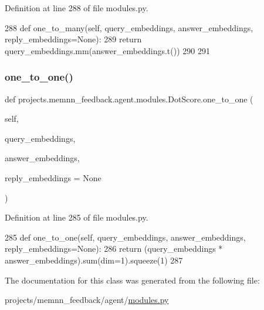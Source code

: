 Definition at line 288 of file modules.\+py.


\begin{DoxyCode}
288     \textcolor{keyword}{def }one\_to\_many(self, query\_embeddings, answer\_embeddings, reply\_embeddings=None):
289         \textcolor{keywordflow}{return} query\_embeddings.mm(answer\_embeddings.t())
290 
291 
\end{DoxyCode}
\mbox{\label{classprojects_1_1memnn__feedback_1_1agent_1_1modules_1_1DotScore_aa8bc1b8eefcd08b7e2bf4540a379ad41}} 
\subsubsection{\texorpdfstring{one\+\_\+to\+\_\+one()}{one\_to\_one()}}
{\footnotesize\ttfamily def projects.\+memnn\+\_\+feedback.\+agent.\+modules.\+Dot\+Score.\+one\+\_\+to\+\_\+one (\begin{DoxyParamCaption}\item[{}]{self,  }\item[{}]{query\+\_\+embeddings,  }\item[{}]{answer\+\_\+embeddings,  }\item[{}]{reply\+\_\+embeddings = {\ttfamily None} }\end{DoxyParamCaption})}



Definition at line 285 of file modules.\+py.


\begin{DoxyCode}
285     \textcolor{keyword}{def }one\_to\_one(self, query\_embeddings, answer\_embeddings, reply\_embeddings=None):
286         \textcolor{keywordflow}{return} (query\_embeddings * answer\_embeddings).sum(dim=1).squeeze(1)
287 
\end{DoxyCode}


The documentation for this class was generated from the following file\+:\begin{DoxyCompactItemize}
\item 
projects/memnn\+\_\+feedback/agent/\hyperlink{projects_2memnn__feedback_2agent_2modules_8py}{modules.\+py}\end{DoxyCompactItemize}
